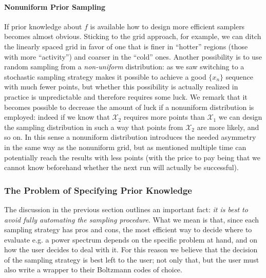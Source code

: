 \paragraph{Nonuniform Prior Sampling}
If prior knowledge about $f$ is available how to design more efficient samplers becomes almost obvious. Sticking to the grid approach, for example, we can ditch the linearly spaced grid in favor of one that is finer in ``hotter'' regions (those with more ``activity'') and coarser in the ``cold'' ones.
Another possibility is to use random sampling from a \emph{non-uniform} distribution: as we saw switching to a stochastic sampling strategy makes it possible to achieve a good $\{x_n\}$ sequence with much fewer points, but whether this possibility is actually realized in practice is unpredictable and therefore requires some luck. We remark that it becomes possible to decrease the amount of luck if a nonuniform distribution is employed: indeed if we know that $\mathcal{X}_2$ requires more points than $\mathcal{X}_1$ we can design the sampling distribution in such a way that points from $\mathcal{X}_2$ are more likely, and so on. In this sense a nonuniform distribution introduces the needed asymmetry in the same way as the nonuniform grid, but as mentioned multiple time can potentially reach the results with less points (with the price to pay being that we cannot know beforehand whether the next run will actually be successful).

\subsubsection{The Problem of Specifying Prior Knowledge}\label{subsubsec:prior_knowledge_generator}
The discussion in the previous section outlines an important fact: \emph{it is best to avoid fully automating the sampling procedure}. What we mean is that, since each sampling strategy has pros and cons, the most efficient way to decide where to evaluate e.g. a power spectrum depends on the specific problem at hand, and on how the user decides to deal with it. For this reason we believe that the decision of the sampling strategy is best left to the user; not only that, but the user must also write a wrapper to their Boltzmann codes of choice. 

